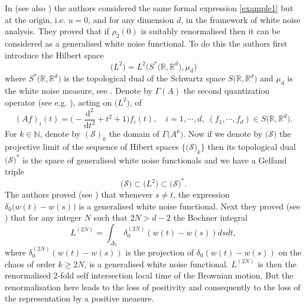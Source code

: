 \documentclass[]{interact}
\newcommand{\R}{{\mathbb{R}}}
\newcommand{\1}{\mathbf{1}}
\newcommand{\N}{{\mathbb N}}
\theoremstyle{plain}%
\theoremstyle{definition}
\theoremstyle{remark}
\begin{document}
In \cite{FHSW97} (see also \cite{BOS16}) the authors considered the same formal expression \eqref{example1} but at the origin, i.e. $u=0$, and for any dimension $d$, in the framework of white noise analysis. They proved that if $\rho_2(0)$ is suitably renormalised then it can be considered as a generalised white noise functional. To do this the authors first introduce the Hilbert space 
$$ \big( L^2 \big)=L^2\Big( S^*\big( \R,\R^d\big), \mu_d\Big)  $$ 
where $S^*\big( \R,\R^d\big)$ is the topological dual of the Schwartz space $S\big( \R,\R^d\big)$ and $\mu_d$ is the white noise measure, see \cite{Kuo95}.
Denote by $\Gamma(A)$ the second quantization operator (see e.g. \cite{Dor94}), acting on $\big(L^2\big)$, of 
$$ (Af)_i(t)=\Big( -\dfrac{\mathrm{d}^2}{\mathrm{d}t^2} + t^2+1 \Big ) f_i(t),\quad i=1,\cdots,d,\; (f_1,\cdots,f_d)\in S\big( \R,\R^d\big). $$
For $k\in \N$, denote by $(\mathcal{S})_k$ the domain of $\Gamma \big( A^k \big)$. Now if we denote by $\big(\mathcal{S}\big)$ the projective limit of the sequence of Hibert spaces $\{ \big(\mathcal{S}\big)_k \}$ then its topological dual $\big(\mathcal{S}\big)^*$ is the space of generalised white noise functionals and we have a Gelfand triple 
$$ \big(\mathcal{S}\big) \subset \big( L^2 \big)\subset \big(\mathcal{S}\big)^*.$$
The authors proved (see \cite[Proposition 1]{FHSW97}) that whenever $s\neq t$, the expression $ \delta_0 \big(w(t)-w(s)\big) $ is a generalised white noise functional. Next they proved (see \cite[Theorem 2]{FHSW97}) that for any integer $N$ such that $2N>d-2$ the Bochner integral 
$$L^{(2N)}=\int_{\Delta_2} \delta_0^{(2N)}(w(t)-w(s))ds dt,$$ 
where $\delta_0^{(2N)}(w(t)-w(s))$ is the projection of $ \delta_0(w(t)-w(s)) $ on the chaos of order $k\geqslant 2N$, is a generalised white noise functional. $L^{(2N)}$ is then the renormalised 2-fold self intersection local time of the Brownian motion. But the renormalisation here leads to the loss of positivity and consequently to the loss of the representation by a positive measure.\\
\end{document}
